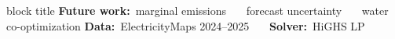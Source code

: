\documentclass[final]{beamer}
\newlength{\colw}\setlength{\colw}{0.312\paperwidth}
\newlength{\colht}\setlength{\colht}{0.845\paperheight}  %
\begin{document}
\begin{frame}[t]{}
\begin{columns}[t]
\begin{column}{\colw}
\begin{minipage}[t][\colht]{\linewidth}
\end{minipage}
\end{column}
\end{columns}

\vspace{0.15cm}
\begin{beamercolorbox}[wd=\paperwidth,sep=0.3cm,rounded=true]{block title}
\centering\small
\textbf{Future work:}\ marginal emissions \ \textbullet\ \ forecast uncertainty \ \textbullet\ \ water co-optimization \qquad\textbf{Data:}\ ElectricityMaps 2024--2025 \ \textbullet\ \ \textbf{Solver:}\ HiGHS LP
\end{beamercolorbox}

\end{frame}
\end{document}
